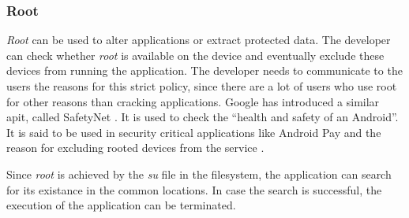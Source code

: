 \subsubsection{Root} \label{subsection:counter-improve-tampering-root}
\textit{Root} can be used to alter applications or extract protected data.
The developer can check whether \textit{root} is available on the device and eventually exclude these devices from running the application.
The developer needs to communicate to the users the reasons for this strict policy, since there are a lot of users who use root for other reasons than cracking applications.
\newline
Google has introduced a similar \gls{api}t, called SafetyNet \cite{safetynetGoogle}.
It is used to check the “health and safety of an Android”\cite{safetynetDev}.
It is said to be used in security critical applications like Android Pay and the reason for excluding rooted devices from the service \cite{safetynetGoogle} \cite{safetynetPay} \cite{safetynetPayx}.
\newline

Since \textit{root} is achieved by the \textit{su} file in the filesystem, the application can search for its existance in the common locations.
In case the search is successful, the execution of the application can be terminated.
